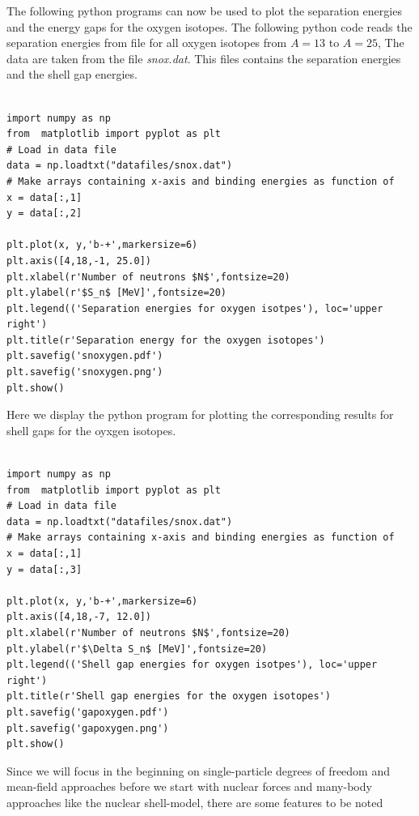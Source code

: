 \documentclass[%
oneside,                 %
final,                   %
10pt]{article}
\begin{document}
The following python programs can now be used to plot the separation energies and the energy gaps for the oxygen isotopes.  The following python code reads the separation energies from file for all oxygen isotopes from $A=13$ to $A=25$, The data are taken from the file \emph{snox.dat}.  This files contains the separation energies and the shell gap energies.
\begin{verbatim}

import numpy as np
from  matplotlib import pyplot as plt
# Load in data file
data = np.loadtxt("datafiles/snox.dat")
# Make arrays containing x-axis and binding energies as function of
x = data[:,1]
y = data[:,2]

plt.plot(x, y,'b-+',markersize=6)
plt.axis([4,18,-1, 25.0])
plt.xlabel(r'Number of neutrons $N$',fontsize=20)
plt.ylabel(r'$S_n$ [MeV]',fontsize=20)
plt.legend(('Separation energies for oxygen isotpes'), loc='upper right')
plt.title(r'Separation energy for the oxygen isotopes')
plt.savefig('snoxygen.pdf')
plt.savefig('snoxygen.png')
plt.show()
\end{verbatim}


Here we display the python program for plotting the corresponding results for shell gaps for the oyxgen isotopes. 
\begin{verbatim}

import numpy as np
from  matplotlib import pyplot as plt
# Load in data file
data = np.loadtxt("datafiles/snox.dat")
# Make arrays containing x-axis and binding energies as function of
x = data[:,1]
y = data[:,3]

plt.plot(x, y,'b-+',markersize=6)
plt.axis([4,18,-7, 12.0])
plt.xlabel(r'Number of neutrons $N$',fontsize=20)
plt.ylabel(r'$\Delta S_n$ [MeV]',fontsize=20)
plt.legend(('Shell gap energies for oxygen isotpes'), loc='upper right')
plt.title(r'Shell gap energies for the oxygen isotopes')
plt.savefig('gapoxygen.pdf')
plt.savefig('gapoxygen.png')
plt.show()
\end{verbatim}





Since we will focus in the beginning on single-particle degrees of freedom and mean-field approaches before we
start with nuclear forces and many-body approaches like the nuclear shell-model, there are some features to be noted
\end{document}

